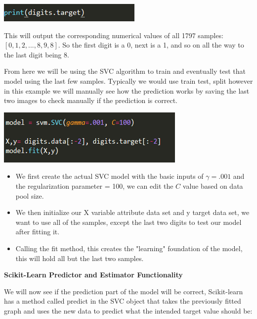 \documentclass[a4paper,12pt]{report}
\newcommand{\msection}[1]{\noindent\textbf{#1}}
\begin{document}
\begin{center}
    \captionsetup{type=figure}
    \includegraphics[width=.5\linewidth]{media/printdigits.png}
\end{center}

This will output the corresponding numerical values of all 1797 samples: $[0, 1, 2, ..., 8, 9, 8]$. So the first digit is a 0, next is a 1, and so on all the way to the last digit being 8.

From here we will be using the SVC algorithm to train and eventually test that model using the last few samples. Typically we would use train test, split however in this example we will manually see how the prediction works by saving the last two images to check manually if the prediction is correct.

\begin{center}
    \captionsetup{type=figure}
    \includegraphics[width=.5\linewidth]{media/svmSVC.png}
\end{center}

\begin{itemize}[,]
    \setlength\itemsep{-.1cm}
    \item We first create the actual SVC model with the basic inputs of $\gamma = .001$ and the regularization parameter = 100, we can edit the $C$ value based on data pool size.
    \item We then initialize our X variable attribute data set and y target data set, we want to use all of the samples, except the last two digits to test our model after fitting it.
    \item Calling the fit method, this creates the "learning" foundation of the model, this will hold all but the last two samples.
\end{itemize}

\msection{Scikit-Learn Predictor and Estimator Functionality}

We will now see if the prediction part of the model will be correct, Scikit-learn has a method called predict in the SVC object that takes the previously fitted graph and uses the new data to predict what the intended target value should be:
\end{document}
